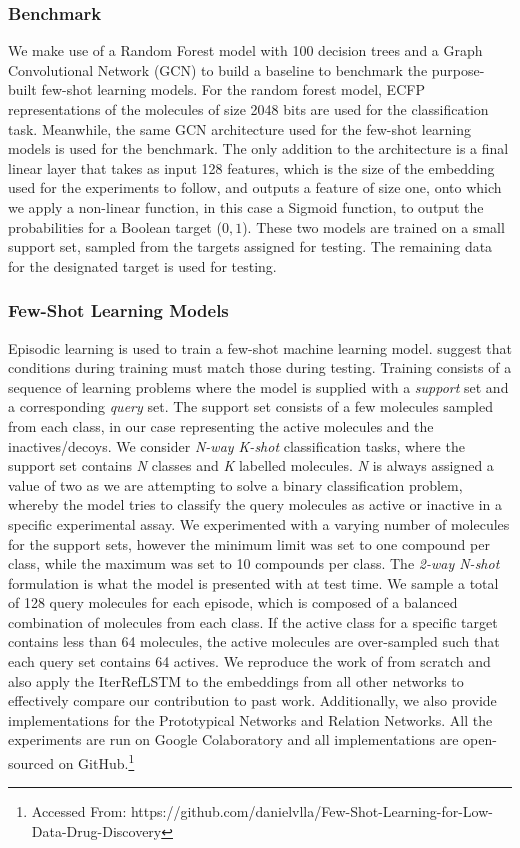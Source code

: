 \subsubsection{Benchmark}

We make use of a Random Forest model with 100 decision trees and a Graph Convolutional Network (GCN) to build a baseline to benchmark the purpose-built few-shot learning models. For the random forest model, ECFP representations of the molecules of size 2048 bits are used for the classification task. Meanwhile, the same GCN architecture used for the few-shot learning models is used for the benchmark. The only addition to the architecture is a final linear layer that takes as input 128 features, which is the size of the embedding used for the experiments to follow, and outputs a feature of size one, onto which we apply a non-linear function, in this case a Sigmoid function, to output the probabilities for a Boolean target (${0, 1}$). These two models are trained on a small support set, sampled from the targets assigned for testing. The remaining data for the designated target is used for testing.

\subsubsection{Few-Shot Learning Models}

Episodic learning is used to train a few-shot machine learning model. \citet{vinyals2016matching} suggest that conditions during training must match those during testing. Training consists of a sequence of learning problems where the model is supplied with a \textit{support} set and a corresponding \textit{query} set. The support set consists of a few molecules sampled from each class, in our case representing the active molecules and the inactives/decoys. We consider \textit{N-way K-shot} classification tasks, where the support set contains \textit{N} classes and \textit{K} labelled molecules. \textit{N} is always assigned a value of two as we are attempting to solve a binary classification problem, whereby the model tries to classify the query molecules as active or inactive in a specific experimental assay. We experimented with a varying number of molecules for the support sets, however the minimum limit was set to one compound per class, while the maximum was set to 10 compounds per class. The \textit{2-way N-shot} formulation is what the model is presented with at test time. We sample a total of 128 query molecules for each episode, which is composed of a balanced combination of molecules from each class. If the active class for a specific target contains less than 64 molecules, the active molecules are over-sampled such that each query set contains 64 actives. We reproduce the work of \citet{altae2017low} from scratch and also apply the IterRefLSTM to the embeddings from all other networks to effectively compare our contribution to past work. Additionally, we also provide implementations for the Prototypical Networks and Relation Networks. All the experiments are run on Google Colaboratory and all implementations are open-sourced on GitHub.\footnote{Accessed From: https://github.com/danielvlla/Few-Shot-Learning-for-Low-Data-Drug-Discovery}

